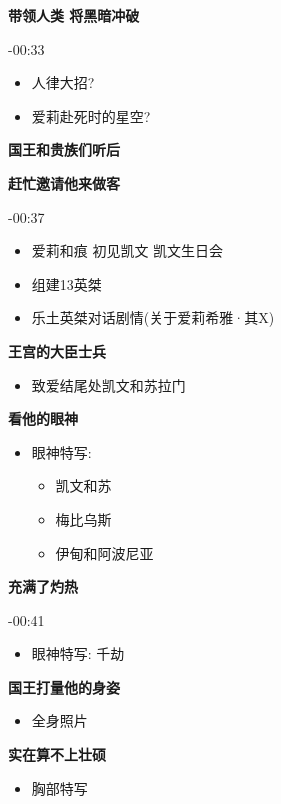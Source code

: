 \documentclass[a4paper]{article}
\begin{document}
\textbf{带领人类 将黑暗冲破}

-00:33

\begin{itemize}
    \item 人律大招?
    \item 爱莉赴死时的星空?
\end{itemize}

\textbf{国王和贵族们听后}

\textbf{赶忙邀请他来做客}

-00:37

\begin{itemize}
    \item 爱莉和痕 初见凯文 凯文生日会
    \item 组建13英桀
    \item 乐土英桀对话剧情(关于爱莉希雅·其X)
\end{itemize}

\textbf{王宫的大臣士兵}

\begin{itemize}
    \item 致爱结尾处凯文和苏拉门
\end{itemize}

\textbf{看他的眼神}

\begin{itemize}
    \item 眼神特写:
    \begin{itemize}
        \item 凯文和苏
        \item 梅比乌斯
        \item 伊甸和阿波尼亚
    \end{itemize}
\end{itemize}

\textbf{充满了灼热}

-00:41

\begin{itemize}
    \item 眼神特写: 千劫
\end{itemize}

\textbf{国王打量他的身姿}

\begin{itemize}
    \item 全身照片
\end{itemize}

\textbf{实在算不上壮硕}

\begin{itemize}
    \item 胸部特写
\end{itemize}
\end{document}
